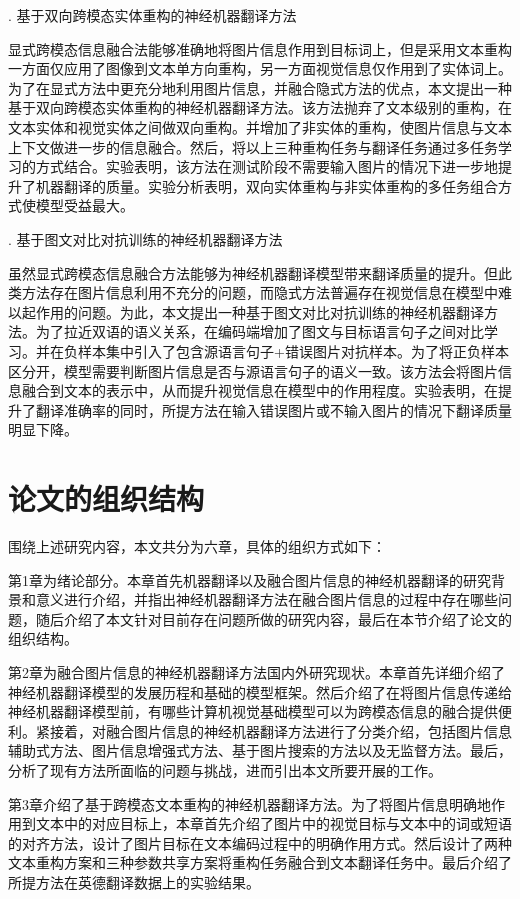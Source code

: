 {. 基于双向跨模态实体重构的神经机器翻译方法}

显式跨模态信息融合法能够准确地将图片信息作用到目标词上，但是采用文本重构一方面仅应用了图像到文本单方向重构，另一方面视觉信息仅作用到了实体词上。为了在显式方法中更充分地利用图片信息，并融合隐式方法的优点，本文提出一种基于双向跨模态实体重构的神经机器翻译方法。该方法抛弃了文本级别的重构，在文本实体和视觉实体之间做双向重构。并增加了非实体的重构，使图片信息与文本上下文做进一步的信息融合。然后，将以上三种重构任务与翻译任务通过多任务学习的方式结合。实验表明，该方法在测试阶段不需要输入图片的情况下进一步地提升了机器翻译的质量。实验分析表明，双向实体重构与非实体重构的多任务组合方式使模型受益最大。

{. 基于图文对比对抗训练的神经机器翻译方法}

虽然显式跨模态信息融合方法能够为神经机器翻译模型带来翻译质量的提升。但此类方法存在图片信息利用不充分的问题，而隐式方法普遍存在视觉信息在模型中难以起作用的问题。为此，本文提出一种基于图文对比对抗训练的神经机器翻译方法。为了拉近双语的语义关系，在编码端增加了图文与目标语言句子之间对比学习。并在负样本集中引入了包含源语言句子+错误图片对抗样本。为了将正负样本区分开，模型需要判断图片信息是否与源语言句子的语义一致。该方法会将图片信息融合到文本的表示中，从而提升视觉信息在模型中的作用程度。实验表明，在提升了翻译准确率的同时，所提方法在输入错误图片或不输入图片的情况下翻译质量明显下降。


\section{论文的组织结构}

围绕上述研究内容，本文共分为六章，具体的组织方式如下：

第1章为绪论部分。本章首先机器翻译以及融合图片信息的神经机器翻译的研究背景和意义进行介绍，并指出神经机器翻译方法在融合图片信息的过程中存在哪些问题，随后介绍了本文针对目前存在问题所做的研究内容，最后在本节介绍了论文的组织结构。

第2章为融合图片信息的神经机器翻译方法国内外研究现状。本章首先详细介绍了神经机器翻译模型的发展历程和基础的模型框架。然后介绍了在将图片信息传递给神经机器翻译模型前，有哪些计算机视觉基础模型可以为跨模态信息的融合提供便利。紧接着，对融合图片信息的神经机器翻译方法进行了分类介绍，包括图片信息辅助式方法、图片信息增强式方法、基于图片搜索的方法以及无监督方法。最后，分析了现有方法所面临的问题与挑战，进而引出本文所要开展的工作。

第3章介绍了基于跨模态文本重构的神经机器翻译方法。为了将图片信息明确地作用到文本中的对应目标上，本章首先介绍了图片中的视觉目标与文本中的词或短语的对齐方法，设计了图片目标在文本编码过程中的明确作用方式。然后设计了两种文本重构方案和三种参数共享方案将重构任务融合到文本翻译任务中。最后介绍了所提方法在英德翻译数据上的实验结果。

